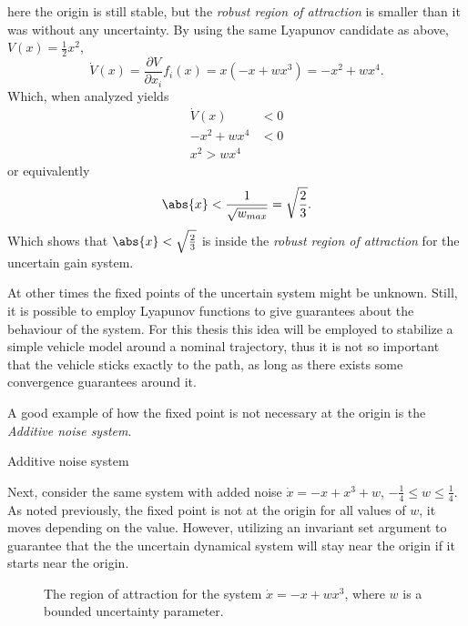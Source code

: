 here the origin is still stable, but the \textit{robust region of attraction} is
smaller than it was without any uncertainty. By using the same Lyapunov
candidate as above, \(V(x) = \frac{1}{2}x^2\),
\[
  \dot{V}(x) = \frac{\partial V}{\partial x_i} f_i(x) = x(-x + wx^3) = -x^2 +
  wx^4.
\]
Which, when analyzed yields
\begin{align*}
  \dot{V}(x) &< 0 \\
  -x^2 + wx^4 &< 0 \\
  x^2 > wx^4
\end{align*}
or equivalently
\[
  \abs{x} < \frac{1}{\sqrt{w_{max}}} = \sqrt{\frac{2}{3}}.
\]
Which shows that \(\abs{x} < \sqrt{\frac{2}{3}}\) is inside the \textit{robust
  region of attraction} for the uncertain gain system.

At other times the fixed points of the uncertain system might be unknown. Still,
it is possible to employ Lyapunov functions to give guarantees about the
behaviour of the system. For this thesis this idea will be employed to stabilize
a simple vehicle model around a nominal trajectory, thus it is not so important
that the vehicle sticks exactly to the path, as long as there exists some
convergence guarantees around it.

A good example of how the fixed point is not necessary at the origin is the
\textit{Additive noise system}.

\begin{example}{Additive noise system}

  Next, consider the same system with added noise \(\dot{x} = -x + x^3 + w\),
  \(-\frac{1}{4} \leq w \leq \frac{1}{4}\). As noted previously, the fixed point
  is not at the origin for all values of \(w\), it moves depending on the value.
  However, utilizing an invariant set argument to guarantee that the the
  uncertain dynamical system will stay near the origin if it starts near the
  origin.

\begin{figure}
  
  \caption{The region of attraction for the system \(\dot{x} = -x + wx^3\),
    where \(w\) is a bounded uncertainty parameter.}
\end{figure}
\end{example}


